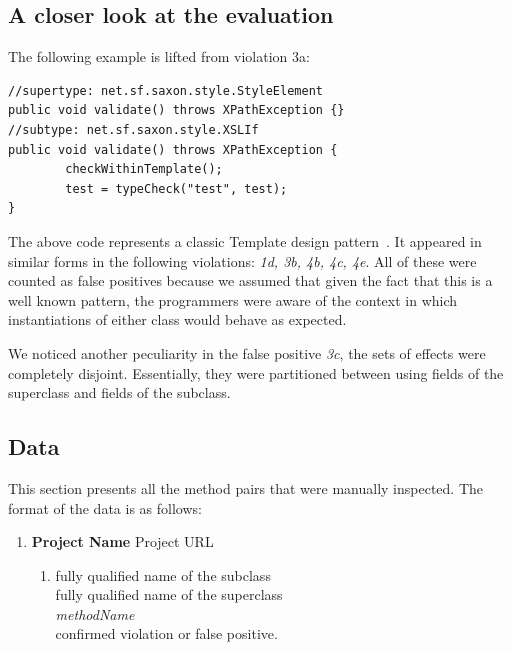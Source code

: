 \documentclass{acm_proc_article-sp}
\begin{document}
 \subsection{A closer look at the evaluation}\label{data:improvement}
 The following example is lifted from violation 3a:
 \begin{lstlisting}
//supertype: net.sf.saxon.style.StyleElement
public void validate() throws XPathException {}
//subtype: net.sf.saxon.style.XSLIf
public void validate() throws XPathException {
        checkWithinTemplate();
        test = typeCheck("test", test);
}
\end{lstlisting}
The above code represents a classic Template design pattern~\cite{vlissides1995design}. It appeared in similar forms in the following violations: \emph{1d, 3b, 4b, 4c, 4e}. All of these were counted as false positives because we assumed that given the fact that this is a well known pattern, the programmers were aware of the context in which instantiations of either class would behave as expected.

We noticed another peculiarity in the false positive \emph{3c}, the sets of effects were completely disjoint. Essentially, they were partitioned between using fields of the superclass and fields of the subclass.

\subsection{Data}\label{ref:data}
This section presents all the method pairs that were manually inspected. The format of the data is as follows:
\begin{enumerate}
\item \textbf{Project Name} Project URL \\
  \begin{enumerate}
  \item fully qualified name of the subclass\\
    fully qualified name of the superclass \\
    \emph{methodName}\\
    confirmed violation or false positive.
  \end{enumerate}
\end{enumerate}
\end{document}
